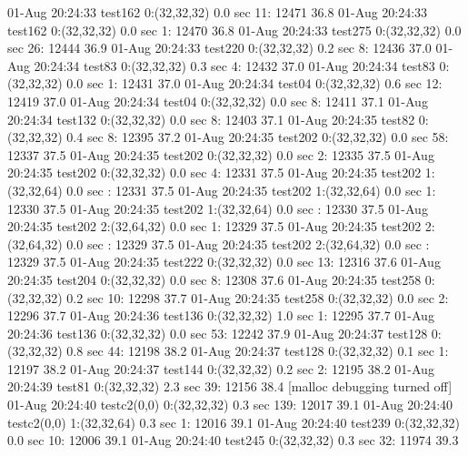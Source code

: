 01-Aug 20:24:33 test162     0:(32,32,32)     0.0 sec   11: 12471 36.8%
01-Aug 20:24:33 test162     0:(32,32,32)     0.0 sec    1: 12470 36.8%
01-Aug 20:24:33 test275     0:(32,32,32)     0.0 sec   26: 12444 36.9%
01-Aug 20:24:33 test220     0:(32,32,32)     0.2 sec    8: 12436 37.0%
01-Aug 20:24:34 test83      0:(32,32,32)     0.3 sec    4: 12432 37.0%
01-Aug 20:24:34 test83      0:(32,32,32)     0.0 sec    1: 12431 37.0%
01-Aug 20:24:34 test04      0:(32,32,32)     0.6 sec   12: 12419 37.0%
01-Aug 20:24:34 test04      0:(32,32,32)     0.0 sec    8: 12411 37.1%
01-Aug 20:24:34 test132     0:(32,32,32)     0.0 sec    8: 12403 37.1%
01-Aug 20:24:35 test82      0:(32,32,32)     0.4 sec    8: 12395 37.2%
01-Aug 20:24:35 test202     0:(32,32,32)     0.0 sec   58: 12337 37.5%
01-Aug 20:24:35 test202     0:(32,32,32)     0.0 sec    2: 12335 37.5%
01-Aug 20:24:35 test202     0:(32,32,32)     0.0 sec    4: 12331 37.5%
01-Aug 20:24:35 test202     1:(32,32,64)     0.0 sec     : 12331 37.5%
01-Aug 20:24:35 test202     1:(32,32,64)     0.0 sec    1: 12330 37.5%
01-Aug 20:24:35 test202     1:(32,32,64)     0.0 sec     : 12330 37.5%
01-Aug 20:24:35 test202     2:(32,64,32)     0.0 sec    1: 12329 37.5%
01-Aug 20:24:35 test202     2:(32,64,32)     0.0 sec     : 12329 37.5%
01-Aug 20:24:35 test202     2:(32,64,32)     0.0 sec     : 12329 37.5%
01-Aug 20:24:35 test222     0:(32,32,32)     0.0 sec   13: 12316 37.6%
01-Aug 20:24:35 test204     0:(32,32,32)     0.0 sec    8: 12308 37.6%
01-Aug 20:24:35 test258     0:(32,32,32)     0.2 sec   10: 12298 37.7%
01-Aug 20:24:35 test258     0:(32,32,32)     0.0 sec    2: 12296 37.7%
01-Aug 20:24:36 test136     0:(32,32,32)     1.0 sec    1: 12295 37.7%
01-Aug 20:24:36 test136     0:(32,32,32)     0.0 sec   53: 12242 37.9%
01-Aug 20:24:37 test128     0:(32,32,32)     0.8 sec   44: 12198 38.2%
01-Aug 20:24:37 test128     0:(32,32,32)     0.1 sec    1: 12197 38.2%
01-Aug 20:24:37 test144     0:(32,32,32)     0.2 sec    2: 12195 38.2%
01-Aug 20:24:39 test81      0:(32,32,32)     2.3 sec   39: 12156 38.4%
[malloc debugging turned off]
01-Aug 20:24:40 testc2(0,0) 0:(32,32,32)     0.3 sec  139: 12017 39.1%
01-Aug 20:24:40 testc2(0,0) 1:(32,32,64)     0.3 sec    1: 12016 39.1%
01-Aug 20:24:40 test239     0:(32,32,32)     0.0 sec   10: 12006 39.1%
01-Aug 20:24:40 test245     0:(32,32,32)     0.3 sec   32: 11974 39.3%
